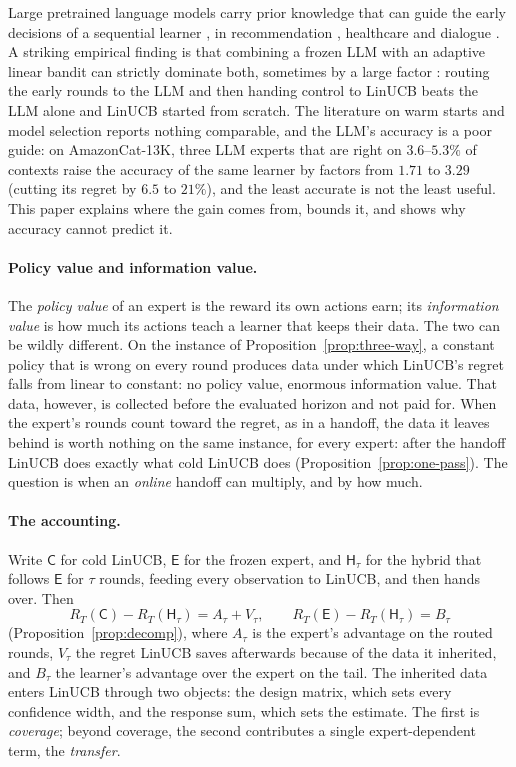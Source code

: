 \documentclass{article}
\theoremstyle{definition}
\theoremstyle{remark}
\theoremstyle{remark}
\newcommand{\Cold}{\mathsf{C}}
\newcommand{\Exp}{\mathsf{E}}
\newcommand{\Hyb}{\mathsf{H}}
\begin{document}
Large pretrained language models carry prior knowledge that can guide the
early decisions of a sequential learner
\cite{brown2020language,ouyang2022training,achiam2023gpt,alamdari2024jumpstarting,abbasiyadkori2024believe},
in recommendation \cite{li2010contextual,agarwal2016making}, healthcare
\cite{tewari2017ads,svensson2023sequential} and dialogue \cite{li2016deep}.
A striking empirical finding is that combining a frozen LLM with an adaptive
linear bandit can strictly dominate both, sometimes by a large factor
\cite{chen2024llmdecision,huangcontextual}: routing the early rounds to the
LLM and then handing control to LinUCB beats the LLM alone and LinUCB started
from scratch. The literature on warm starts and model selection
\cite{bastani2021mostly,zhang2019warm,agarwal2017corralling} reports nothing
comparable, and the LLM's accuracy is a poor guide: on AmazonCat-13K, three
LLM experts that are right on $3.6$--$5.3\%$ of contexts raise the accuracy of
the same learner by factors from $1.71$ to $3.29$ (cutting its regret by $6.5$
to $21\%$), and the least accurate is not the least useful. This paper explains where the gain comes from, bounds
it, and shows why accuracy cannot predict it.

\paragraph{Policy value and information value.}
The \emph{policy value} of an expert is the reward its own actions earn; its
\emph{information value} is how much its actions teach a learner that keeps
their data. The two can be wildly different. On the instance of
Proposition~\ref{prop:three-way}, a constant policy that is wrong on every
round produces data under which LinUCB's regret falls from linear to
constant: no policy value, enormous information value. That data, however, is
collected before the evaluated horizon and not paid for. When the expert's
rounds count toward the regret, as in a handoff, the data it leaves behind is
worth nothing on the same instance, for every expert: after the handoff
LinUCB does exactly what cold LinUCB does (Proposition~\ref{prop:one-pass}). The question
is when an \emph{online} handoff can multiply, and by how much.

\paragraph{The accounting.}
Write $\Cold$ for cold LinUCB, $\Exp$ for the frozen expert, and $\Hyb_\tau$
for the hybrid that follows $\Exp$ for $\tau$ rounds, feeding every
observation to LinUCB, and then hands over. Then
\[
R_T(\Cold)-R_T(\Hyb_\tau)=A_\tau+V_\tau,\qquad R_T(\Exp)-R_T(\Hyb_\tau)=B_\tau
\]
(Proposition~\ref{prop:decomp}), where $A_\tau$ is the expert's advantage on
the routed rounds, $V_\tau$ the regret LinUCB saves afterwards because of the
data it inherited, and $B_\tau$ the learner's advantage over the expert on
the tail. The inherited data enters LinUCB through two objects: the design
matrix, which sets every confidence width, and the response sum, which sets
the estimate. The first is \emph{coverage}; beyond coverage, the second
contributes a single expert-dependent term, the \emph{transfer}.
\end{document}

